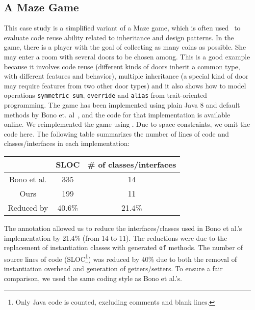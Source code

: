 
\subsection{A Maze Game}
This case study is a simplified variant of a Maze game, which is often
used~\cite{gof,bono14}
to evaluate code reuse ability related to inheritance and design
patterns. In the game, there is a player with the goal of collecting
as many coins as possible. She may enter a room with several doors to
be chosen among. This is a good example because it involves code reuse
(different kinds of doors inherit a common type, with different
features and behavior), multiple inheritance (a special kind of door
may require features from two other door types) and it also shows how
to model operations \texttt{symmetric sum}, \texttt{override} and
\texttt{alias} from trait-oriented programming. The game has been
implemented using plain Java 8 and default methods by Bono
et. al~\cite{bono14}, and the code for that implementation is
available online. We reimplemented the game using \mixin. Due to space
constraints, we omit the code here. The following table summarizes
the number of lines of code and classes/interfaces in each implementation:

\vspace{5pt}
\begin{tabular}{ccc}
\hline
            & SLOC   & \# of classes/interfaces \\ \hline
Bono et al. & 335    & 14                       \\
Ours        & 199    & 11                       \\
\rowcolor[HTML]{C0C0C0}
Reduced by  & 40.6\% & 21.4\%                   \\ \hline
\end{tabular}
\vspace{5pt}

\noindent The \mixin annotation allowed us to reduce the interfaces/classes used
in Bono et al.'s implementation by 21.4\% (from 14 to 11). The
reductions were due to the replacement of instantiation classes with
generated \texttt{of} methods. The number of source lines of code 
(SLOC\footnote{Only Java code is counted, excluding comments and blank lines. })
was reduced by 40\% due to both the removal of instantiation overhead and
generation of getters/setters. %
To ensure a fair comparison, we used the same coding style as Bono et al.'s.

